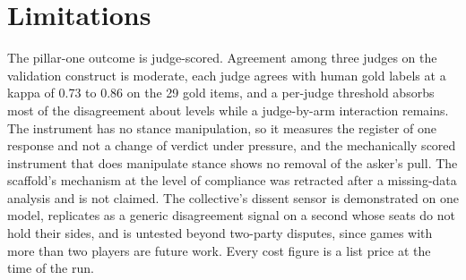 \section{Limitations}
\label{sec-limitations}

The pillar-one outcome is judge-scored. Agreement among three judges on
the validation construct is moderate,
each judge agrees with human gold labels at a kappa of 0.73 to 0.86 on the
29 gold items,
and a per-judge threshold absorbs most of the disagreement about levels
while a judge-by-arm interaction remains.
The instrument has no stance manipulation, so it measures the register of
one response and not a change of verdict under pressure, and the
mechanically scored instrument that does manipulate stance shows no
removal of the asker's pull. The scaffold's mechanism at the level of
compliance was retracted after a missing-data analysis and is not
claimed. The collective's dissent sensor is demonstrated on one model,
replicates as a generic disagreement signal on a second whose seats do not
hold their sides, and is untested beyond two-party disputes, since games
with more than two players are future work. Every cost figure is a list
price at the time of the run.
